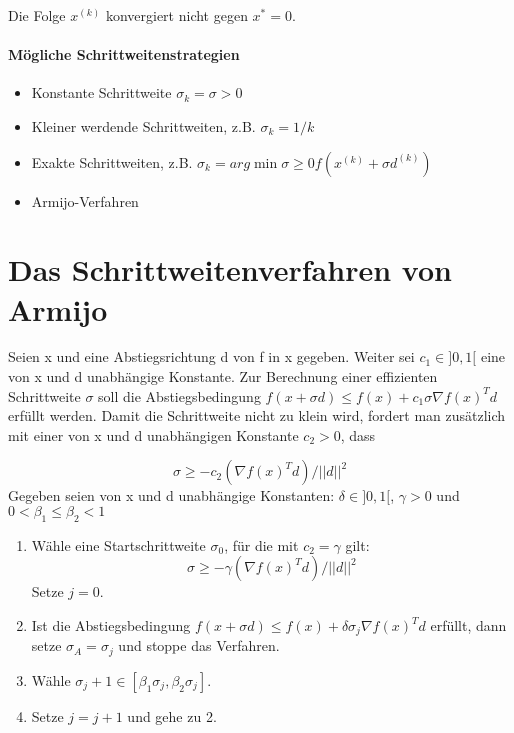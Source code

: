 Die Folge $x^{(k)}$ konvergiert nicht gegen $x^{*} = 0$.


\paragraph{Mögliche Schrittweitenstrategien}

\begin{itemize}
	\item Konstante Schrittweite $\sigma_k = \sigma > 0$
	\item Kleiner werdende Schrittweiten, z.B. $\sigma_k = 1/k$
	\item Exakte Schrittweiten, z.B. $\sigma_k = arg \min {\sigma \geq 0} f(x^{(k)} + \sigma d^{(k)})$
	\item  Armijo-Verfahren
\end{itemize}

\section{Das Schrittweitenverfahren von Armijo}

Seien x und eine Abstiegsrichtung d von f in x gegeben. Weiter sei
$c_1 \in ]0, 1[$ eine von x und d unabhängige Konstante. Zur Berechnung
einer effizienten Schrittweite $\sigma$ soll die Abstiegsbedingung
$f(x + \sigma d) \leq f(x) + c_1 \sigma \nabla f(x)^Td$
erfüllt werden. Damit die Schrittweite nicht zu klein wird, fordert man
zusätzlich mit einer von x und d unabhängigen Konstante $c_2 > 0$, dass

\begin{equation}
\sigma \geq -c_2 (\nabla f(x)^Td) / ||d||^2 
\end{equation}
Gegeben seien von x und d unabhängige Konstanten:
$\delta \in ]0, 1[$, $\gamma > 0$ und $0 < \beta_1 \leq \beta_2 < 1$

\begin{enumerate}
	\item  Wähle eine Startschrittweite $\sigma_0$, für die mit $c_2 = \gamma$ gilt:
	\begin{equation}
	\sigma \geq - \gamma (\nabla f(x)^Td)/||d||^2
	\end{equation}
	Setze $j = 0$.
	\item Ist die Abstiegsbedingung
	 $f(x + \sigma d) \leq f(x) + \delta \sigma_j \nabla f(x)^Td$
	 erfüllt, dann setze $\sigma_A = \sigma_j$ und stoppe das Verfahren.
	\item Wähle $\sigma_j+ 1 \in [\beta_1 \sigma_j , \beta_2 \sigma_j ]$.
	\item Setze $j = j + 1$ und gehe zu 2.
\end{enumerate}


